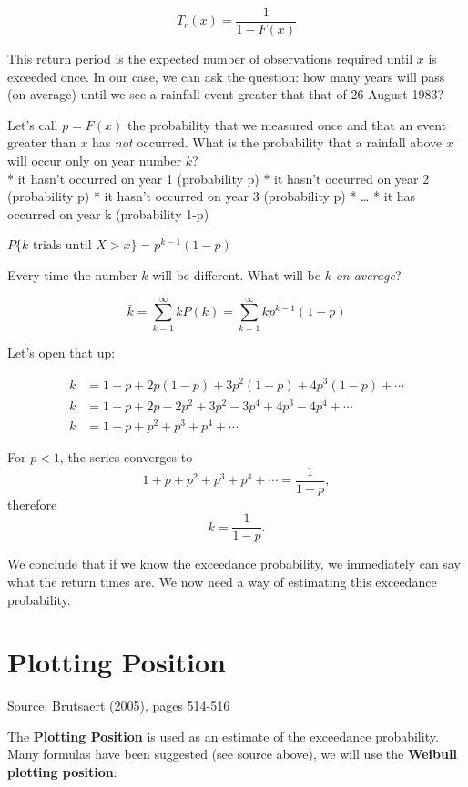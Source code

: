 \documentclass[
  letterpaper,
  DIV=11,
  numbers=noendperiod]{scrreprt}
\begin{document}
\[
T_r(x) = \frac{1}{1-F(x)}
\]

This return period is the expected number of observations required until
\(x\) is exceeded once. In our case, we can ask the question: how many
years will pass (on average) until we see a rainfall event greater that
that of 26 August 1983?

Let's call \(p=F(x)\) the probability that we measured once and that an
event greater than \(x\) has \emph{not} occurred. What is the
probability that a rainfall above \(x\) will occur only on year number
\(k\)?\\
* it hasn't occurred on year 1 (probability p) * it hasn't occurred on
year 2 (probability p) * it hasn't occurred on year 3 (probability p) *
\ldots{} * it has occurred on year k (probability 1-p)

\(P\{k \text{ trials until }X>x\} = p^{k-1}(1-p)\)

Every time the number \(k\) will be different. What will be \(k\)
\emph{on average}?

\[\bar{k} = \displaystyle\sum_{k=1}^{\infty} k P(k) = \displaystyle\sum_{k=1}^{\infty} k p^{k-1}(1-p)\]

Let's open that up:

\[
\begin{align}
\bar{k} &= 1-p + 2p(1-p) + 3p^2(1-p) + 4p^3(1-p)+ \cdots\\
\bar{k} &= 1-p + 2p - 2p^2 + 3p^2 - 3p^4 + 4p^3 - 4p^4+ \cdots \\
\bar{k} &= 1 + p + p^2 + p^3 + p^4 + \cdots
\end{align}
\]

For \(p<1\), the series converges to \[
1 + p + p^2 + p^3 + p^4 + \cdots = \frac{1}{1-p},
\] therefore \[
\bar{k} = \frac{1}{1-p}.
\]

We conclude that if we know the exceedance probability, we immediately
can say what the return times are. We now need a way of estimating this
exceedance probability.

\hypertarget{plotting-position}{%
\section{Plotting Position}\label{plotting-position}}

Source: Brutsaert (2005), pages 514-516

The \textbf{Plotting Position} is used as an estimate of the exceedance
probability. Many formulas have been suggested (see source above), we
will use the \textbf{Weibull plotting position}:
\end{document}
